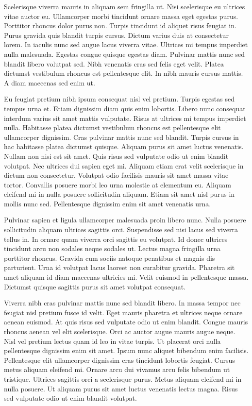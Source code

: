 \documentclass[11pt,a4paper]{article}
\begin{document}
Scelerisque viverra mauris in aliquam sem fringilla ut. Nisi scelerisque eu ultrices vitae auctor eu. Ullamcorper morbi tincidunt ornare massa eget egestas purus. Porttitor rhoncus dolor purus non. Turpis tincidunt id aliquet risus feugiat in. Purus gravida quis blandit turpis cursus. Dictum varius duis at consectetur lorem. In iaculis nunc sed augue lacus viverra vitae. Ultrices mi tempus imperdiet nulla malesuada. Egestas congue quisque egestas diam. Pulvinar mattis nunc sed blandit libero volutpat sed. Nibh venenatis cras sed felis eget velit. Platea dictumst vestibulum rhoncus est pellentesque elit. In nibh mauris cursus mattis. A diam maecenas sed enim ut.

Eu feugiat pretium nibh ipsum consequat nisl vel pretium. Turpis egestas sed tempus urna et. Etiam dignissim diam quis enim lobortis. Libero nunc consequat interdum varius sit amet mattis vulputate. Risus at ultrices mi tempus imperdiet nulla. Habitasse platea dictumst vestibulum rhoncus est pellentesque elit ullamcorper dignissim. Cras pulvinar mattis nunc sed blandit. Turpis cursus in hac habitasse platea dictumst quisque. Aliquam purus sit amet luctus venenatis. Nullam non nisi est sit amet. Quis risus sed vulputate odio ut enim blandit volutpat. Nec ultrices dui sapien eget mi. Aliquam etiam erat velit scelerisque in dictum non consectetur. Volutpat odio facilisis mauris sit amet massa vitae tortor. Convallis posuere morbi leo urna molestie at elementum eu. Aliquam eleifend mi in nulla posuere sollicitudin aliquam. Etiam sit amet nisl purus in mollis nunc sed. Pellentesque dignissim enim sit amet venenatis urna.

Pulvinar sapien et ligula ullamcorper malesuada proin libero nunc. Nulla posuere sollicitudin aliquam ultrices sagittis orci. Suspendisse sed nisi lacus sed viverra tellus in. In ornare quam viverra orci sagittis eu volutpat. Id donec ultrices tincidunt arcu non sodales neque sodales ut. Lectus magna fringilla urna porttitor rhoncus. Gravida cum sociis natoque penatibus et magnis dis parturient. Urna id volutpat lacus laoreet non curabitur gravida. Pharetra sit amet aliquam id diam maecenas ultricies mi. Velit euismod in pellentesque massa. Dictumst quisque sagittis purus sit amet volutpat consequat.

Viverra nibh cras pulvinar mattis nunc sed blandit libero. In massa tempor nec feugiat nisl pretium fusce id velit. Eget mauris pharetra et ultrices neque ornare aenean euismod. At quis risus sed vulputate odio ut enim blandit. Congue mauris rhoncus aenean vel elit scelerisque. Orci ac auctor augue mauris augue neque. Nisl vel pretium lectus quam id leo in vitae turpis. Ut placerat orci nulla pellentesque dignissim enim sit amet. Ipsum nunc aliquet bibendum enim facilisis. Pellentesque elit ullamcorper dignissim cras tincidunt lobortis feugiat. Cursus metus aliquam eleifend mi. Ornare arcu dui vivamus arcu felis bibendum ut tristique. Ultrices sagittis orci a scelerisque purus. Metus aliquam eleifend mi in nulla posuere. Ut aliquam purus sit amet luctus venenatis lectus magna. Risus sed vulputate odio ut enim blandit volutpat.
\end{document}
